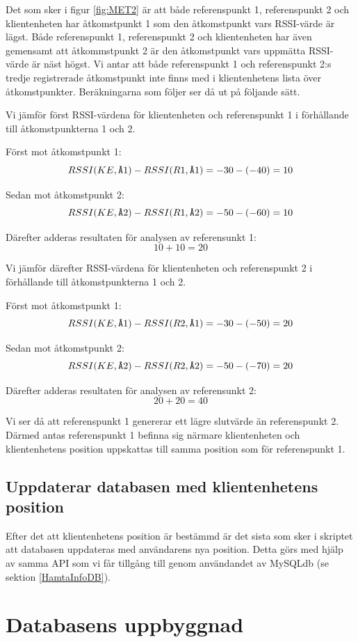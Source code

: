 \documentclass[swedish, a4paper,12pt]{article}
\begin{document}
Det som sker i figur \ref{fig:MET2} är att både referenspunkt 1, referenspunkt 2 och klientenheten har åtkomstpunkt 1 som den åtkomstpunkt vars RSSI-värde är lägst.
Både referenspunkt 1, referenspunkt 2 och klientenheten har även gemensamt att åtkommstpunkt 2 är den åtkomstpunkt vars uppmätta RSSI-värde är näst högst.
Vi antar att både referenspunkt 1 och referenspunkt 2:s tredje registrerade åtkomstpunkt inte finns med i klientenhetens lista över åtkomstpunkter.
Beräkningarna som följer ser då ut på följande sätt.

Vi jämför först RSSI-värdena för klientenheten och referenspunkt 1 i förhållande till åtkomstpunkterna 1 och 2.

Först mot åtkomstpunkt 1: $$ RSSI (KE,\verb|Å|1)  -  RSSI (R1,\verb|Å|1) = -30 - (- 40) = 10 $$

Sedan mot åtkomstpunkt 2: $$ RSSI (KE,\verb|Å|2)  -  RSSI (R1,\verb|Å|2) = -50 - (- 60) = 10 $$

Därefter adderas resultaten för analysen av referensunkt 1: $$ 10 + 10 = 20$$

Vi jämför därefter RSSI-värdena för klientenheten och referenspunkt 2 i förhållande till åtkomstpunkterna 1 och 2.

Först mot åtkomstpunkt 1: $$ RSSI (KE,\verb|Å|1)  -  RSSI (R2,\verb|Å|1) = -30 - (- 50) = 20 $$

Sedan mot åtkomstpunkt 2: $$ RSSI (KE,\verb|Å|2)  -  RSSI (R2,\verb|Å|2) = -50 - (- 70) = 20 $$

Därefter adderas resultaten för analysen av referensunkt 2: $$ 20 + 20 = 40$$

Vi ser då att referenspunkt 1 genererar ett lägre slutvärde än referenspunkt 2. Därmed antas referenspunkt 1 befinna sig närmare klientenheten och klientenhetens position uppskattas till samma position som för referenspunkt 1.

\subsection{Uppdaterar databasen med klientenhetens position}
Efter det att klientenhetens position är bestämmd är det sista som sker i skriptet att databasen uppdateras med användarens nya position. Detta görs med hjälp av samma API som vi får tillgång till genom användandet av MySQLdb (se sektion \ref{HamtaInfoDB}).



\section{Databasens uppbyggnad}\label{databasen}
\end{document}
